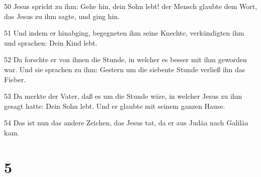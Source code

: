 \par 50 Jesus spricht zu ihm: Gehe hin, dein Sohn lebt! der Mensch glaubte dem Wort, das Jesus zu ihm sagte, und ging hin.
\par 51 Und indem er hinabging, begegneten ihm seine Knechte, verkündigten ihm und sprachen: Dein Kind lebt.
\par 52 Da forschte er von ihnen die Stunde, in welcher es besser mit ihm geworden war. Und sie sprachen zu ihm: Gestern um die siebente Stunde verließ ihn das Fieber.
\par 53 Da merkte der Vater, daß es um die Stunde wäre, in welcher Jesus zu ihm gesagt hatte: Dein Sohn lebt. Und er glaubte mit seinem ganzen Hause.
\par 54 Das ist nun das andere Zeichen, das Jesus tat, da er aus Judäa nach Galiläa kam.

\chapter{5}

